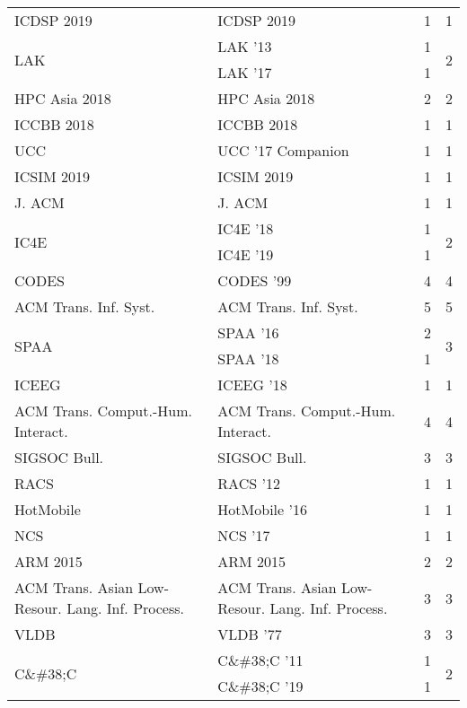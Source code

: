 \begin{table*}[t]
\begin{tabular}{llrr}
\multirow{1}{*}{ICDSP 2019} & ICDSP 2019 & 1 & \multirow{1}{*}{1}\\
\multirow{2}{*}{LAK } & LAK '13 & 1 & \multirow{2}{*}{2}\\
& LAK '17 & 1 &\\
\multirow{1}{*}{HPC Asia 2018} & HPC Asia 2018 & 2 & \multirow{1}{*}{2}\\
\multirow{1}{*}{ICCBB 2018} & ICCBB 2018 & 1 & \multirow{1}{*}{1}\\
\multirow{1}{*}{UCC } & UCC '17 Companion & 1 & \multirow{1}{*}{1}\\
\multirow{1}{*}{ICSIM 2019} & ICSIM 2019 & 1 & \multirow{1}{*}{1}\\
\multirow{1}{*}{J. ACM} & J. ACM & 1 & \multirow{1}{*}{1}\\
\multirow{2}{*}{IC4E } & IC4E '18 & 1 & \multirow{2}{*}{2}\\
& IC4E '19 & 1 &\\
\multirow{1}{*}{CODES } & CODES '99 & 4 & \multirow{1}{*}{4}\\
\multirow{1}{*}{ACM Trans. Inf. Syst.} & ACM Trans. Inf. Syst. & 5 & \multirow{1}{*}{5}\\
\multirow{2}{*}{SPAA } & SPAA '16 & 2 & \multirow{2}{*}{3}\\
& SPAA '18 & 1 &\\
\multirow{1}{*}{ICEEG } & ICEEG '18 & 1 & \multirow{1}{*}{1}\\
\multirow{1}{*}{ACM Trans. Comput.-Hum. Interact.} & ACM Trans. Comput.-Hum. Interact. & 4 & \multirow{1}{*}{4}\\
\multirow{1}{*}{SIGSOC Bull.} & SIGSOC Bull. & 3 & \multirow{1}{*}{3}\\
\multirow{1}{*}{RACS } & RACS '12 & 1 & \multirow{1}{*}{1}\\
\multirow{1}{*}{HotMobile } & HotMobile '16 & 1 & \multirow{1}{*}{1}\\
\multirow{1}{*}{NCS } & NCS '17 & 1 & \multirow{1}{*}{1}\\
\multirow{1}{*}{ARM 2015} & ARM 2015 & 2 & \multirow{1}{*}{2}\\
\multirow{1}{*}{ACM Trans. Asian Low-Resour. Lang. Inf. Process.} & ACM Trans. Asian Low-Resour. Lang. Inf. Process. & 3 & \multirow{1}{*}{3}\\
\multirow{1}{*}{VLDB } & VLDB '77 & 3 & \multirow{1}{*}{3}\\
\multirow{2}{*}{C\&\#38;C } & C\&\#38;C '11 & 1 & \multirow{2}{*}{2}\\
& C\&\#38;C '19 & 1 &\\

\end{tabular}
\end{table*}

